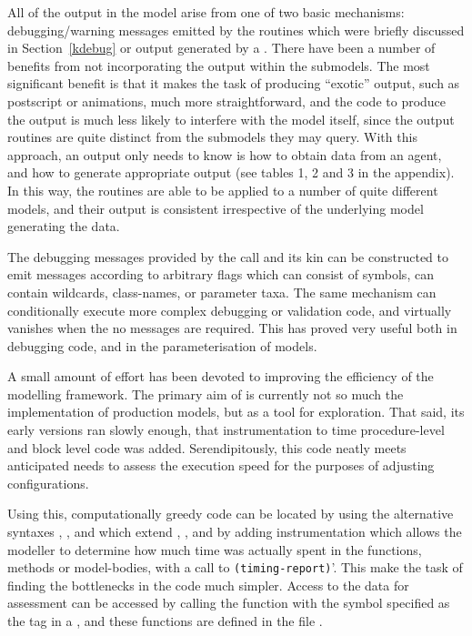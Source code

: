 All of the output in the model arise from one of two basic mechanisms:
debugging/warning messages emitted by the  routines
which were briefly discussed in Section~\ref{kdebug} or output
generated by a \mlogger.  There have been a number of benefits from
not incorporating the output within the submodels.  The most
significant benefit is that it makes the task of producing ``exotic''
output, such as postscript or animations, much more straightforward,
and the code to produce the output is much less likely to interfere
with the model itself, since the output routines are quite distinct
from the submodels they may query.  With this approach, an output only
needs to know is how to obtain data from an agent, and how to generate
appropriate output (see tables 1, 2 and 3 in the appendix). In this way,
the  routines are able to be applied to a number of
quite different models, and their output is consistent irrespective of
the underlying model generating the data.

The debugging messages provided by the  call and its
kin can be constructed to emit messages according to arbitrary flags
which can consist of symbols, can contain wildcards, class-names, or
parameter taxa.  The same mechanism can conditionally execute more
complex debugging or validation code, and virtually vanishes when the
no messages are required.  This has proved very useful both in
debugging code, and in the parameterisation of models.

A small amount of effort has been devoted to improving the efficiency
of the modelling framework.  The primary aim of \ReModel is currently
not so much the implementation of production models, but as a tool for
exploration.  That said, its early versions ran slowly enough, that
instrumentation to time procedure-level and block level code was
added.  Serendipitously, this code neatly meets anticipated needs to
assess the execution speed for the purposes of adjusting
configurations.

Using this, computationally greedy code can be located by using the
alternative syntaxes , ,
and  which extend 
, ,
and  by adding instrumentation which allows the
modeller to determine how much time was actually spent in the
functions, methods or model-bodies, with a call
to \texttt{(timing-report)}'. This make the task of finding the
bottlenecks in the code much simpler.  Access to the data for
assessment can be accessed by calling the
function  with the symbol specified as the tag in
a , and these functions are defined in the
file .

